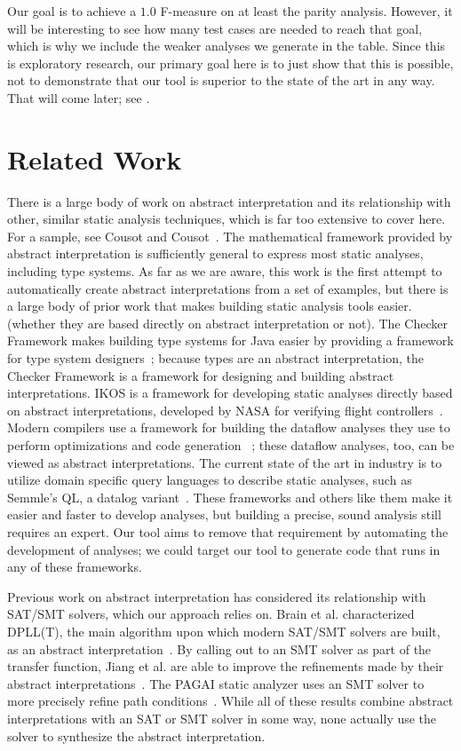 \documentclass[10pt,conference]{IEEEtran}
\begin{document}
Our goal is to achieve a $1.0$ F-measure on at least the parity analysis.
However, it will be interesting to see how many test cases are needed to
reach that goal, which is why we include the weaker analyses we generate
in the table. Since this is exploratory research, our primary goal here
is to just show that this is possible, not to demonstrate that our tool
is superior to the state of the art in any way. That will come later;
see .

\section{Related Work}

There is a large body of work on abstract interpretation and its relationship
with other, similar static analysis techniques, which is far
too extensive to cover here.
For a sample, see Cousot and Cousot~\cite{cousot14}.
The mathematical framework provided by abstract interpretation is sufficiently
general to express most static analyses, including type systems.
As far as we are aware, this work is the first attempt to automatically
create abstract interpretations from a set of examples, but there is a
large body of prior work that makes building static analysis tools easier.
(whether they are based directly on abstract interpretation or not).
The Checker Framework makes building type systems for Java easier
by providing a framework for type system designers~\cite{checker-framework};
because types are an abstract interpretation, the Checker Framework
is a framework for designing and building abstract interpretations.
IKOS is a framework for developing static analyses directly based on
abstract interpretations, developed by NASA for verifying flight
controllers~\cite{ikos}. Modern compilers use a framework for building
the dataflow analyses they use to perform optimizations and code generation
~\cite{lattner04:_llvm}; these dataflow analyses, too, can be viewed as
abstract interpretations. The current state of the art in industry is to
utilize domain specific query languages to describe static analyses, such as 
Semmle's QL, a datalog variant~\cite{semmle-ql-primer}.
These frameworks and others like them make it easier and faster to develop analyses, but 
building a precise, sound analysis still requires an expert.  Our tool 
aims to remove that requirement by automating the development of analyses; 
we could target our tool to generate code that runs in any of these frameworks.

Previous work on abstract interpretation has considered its relationship
with SAT/SMT solvers, which our approach relies on. Brain et al. characterized
DPLL(T), the main algorithm upon which modern SAT/SMT solvers are built,
as an abstract interpretation~\cite{brain2013abstract}. By calling out to
an SMT solver as part of the transfer function, Jiang et al. are able to
improve the refinements made by their abstract
interpretations~\cite{jiang2017block}. The PAGAI static analyzer uses
an SMT solver to more precisely refine path conditions~\cite{pagai}.
While all of these results combine abstract interpretations with
an SAT or SMT solver in some way, none actually use the solver to
synthesize the abstract interpretation.
\end{document}
